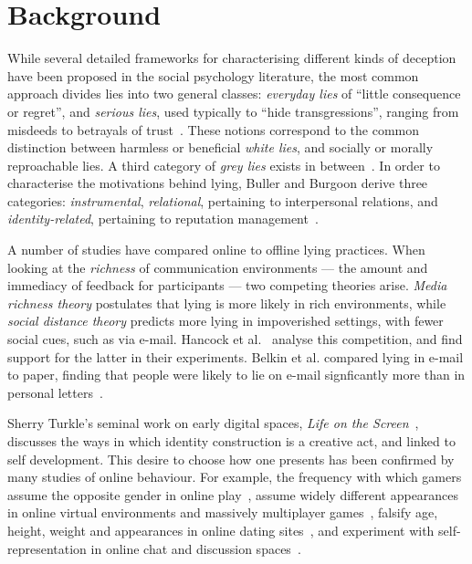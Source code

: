 \documentclass{sig-alternate}
\begin{document}
\section{Background}

 
While several detailed frameworks for characterising different kinds of deception have been proposed in the social psychology literature, the most common approach divides lies into two general classes: \emph{everyday lies} of ``little consequence or regret'', and \emph{serious lies}, used typically to ``hide transgressions'', ranging from misdeeds to betrayals of trust~\cite{depaulo1996lying}. These notions correspond to the common distinction between harmless or beneficial \emph{white lies}, and socially or morally reproachable lies. A third category of \emph{grey lies} exists in between~\cite{camden1984white}.  In order to characterise the motivations behind lying, Buller and Burgoon derive three categories: \emph{instrumental}, \emph{relational}, pertaining to interpersonal relations, and \emph{identity-related}, pertaining to reputation management~\cite{buller1996testing}. 

A number of studies have compared online to offline lying practices. When looking at the \emph{richness} of communication environments --- the amount and immediacy of feedback for participants --- two competing theories arise. \emph{Media richness theory} postulates that lying is more likely in rich environments, while \emph{social distance theory} predicts more lying in impoverished settings, with fewer social cues, such as via e-mail. Hancock et al.~\cite{hancock2004deception} analyse this competition, and  find support for the latter in their experiments. 
Belkin et al. compared lying in e-mail to paper, finding that people were likely to lie on e-mail signficantly more than in personal letters~\cite{naquin2010finer}.  

Sherry Turkle's seminal work on early digital spaces, \emph{Life on the Screen}~\cite{turkle2011life}, discusses the ways in which identity construction is a creative act, and linked to self development. This desire to choose how one presents has been confirmed by many studies of online behaviour. For example, the frequency with which gamers assume the opposite gender in online play~\cite{hussain2008gender,potts2014love,van2008theorizing}, assume widely different appearances in online virtual environments and massively multiplayer games~\cite{yee2009proteus}, falsify age, height, weight and appearances in online dating sites~\cite{Hancock:2007:TLO:1240624.1240697,JCC4:JCC420}, and experiment with self-representation in online chat and discussion spaces~\cite{donath1999identity,whitty2002liar,whitty2001age}.
\end{document}
